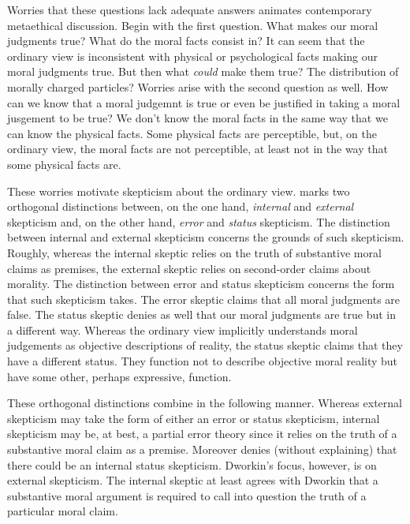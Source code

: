 \documentclass[12pt]{article}
\begin{document}
Worries that these questions lack adequate answers animates contemporary meta\-ethical discussion. Begin with the first question. What makes our moral judgments true? What do the moral facts consist in? It can seem that the ordinary view is inconsistent with physical or psychological facts making our moral judgments true. But then what \emph{could} make them true? The distribution of morally charged particles? Worries arise with the second question as well. How can we know that a moral judgemnt is true or even be justified in taking a moral jusgement to be true? We don't know the moral facts in the same way that we can know the physical facts. Some physical facts are perceptible, but, on the ordinary view, the moral facts are not perceptible, at least not in the way that some physical facts are. 

These worries motivate skepticism about the ordinary view. \citet[30--33]{Dworkin:2011fk} marks two orthogonal distinctions between, on the one hand, \emph{internal} and \emph{external} skepticism and, on the other hand, \emph{error} and \emph{status} skepticism. The distinction between internal and external skepticism concerns the grounds of such skepticism. Roughly, whereas the internal skeptic relies on the truth of substantive moral claims as premises, the external skeptic relies on second-order claims about morality. The distinction between error and status skepticism concerns the form that such skepticism takes. The error skeptic claims that all moral judgments are false. The status skeptic denies as well that our moral judgments are true but in a different way. Whereas the ordinary view implicitly understands moral judgements as objective descriptions of reality, the status skeptic claims that they have a different status. They function not to describe objective moral reality but have some other, perhaps expressive, function.

These orthogonal distinctions combine in the following manner. Whereas external skepticism may take the form of either an error or status skepticism, internal skepticism may be, at best, a partial error theory since it relies on the truth of a substantive moral claim as a premise. Moreover \citet[33]{Dworkin:2011fk} denies (without explaining) that there could be an internal status skepticism. Dworkin's focus, however, is on external skepticism. The internal skeptic at least agrees with Dworkin that a substantive moral argument is required to call into question the truth of a particular moral claim.
\end{document}

